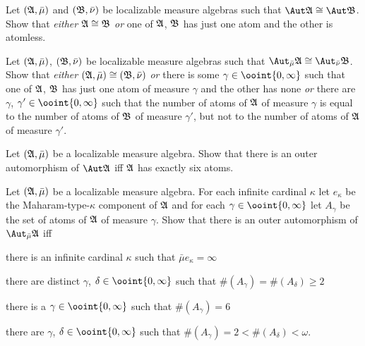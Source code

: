 { %
Let $(\frak A,\bar\mu)$ and
$(\frak B,\bar\nu)$ be localizable measure algebras such that
$\Aut\frak A\cong\Aut\frak B$.   Show that {\it either}
$\frak A\cong\frak B$ {\it
or} one of $\frak A$, $\frak B$ has just one atom and the other is
atomless.
     
Let $(\frak A,\bar\mu)$, $(\frak B,\bar\nu)$ be
localizable measure algebras such that
$\Aut_{\bar\mu}\frak A\cong\Aut_{\bar\nu}\frak B$.   Show that {\it
either} $(\frak A,\bar\mu)\cong(\frak B,\bar\nu)$ {\it or} there is some
$\gamma\in\ooint{0,\infty}$ such that one of $\frak A$, $\frak B$ has
just one atom of measure $\gamma$ and the other has none {\it or} there
are $\gamma$, $\gamma'\in\ooint{0,\infty}$ such that the number of atoms
of $\frak A$ of measure $\gamma$ is equal to the number of atoms of
$\frak B$ of measure $\gamma'$, but not to the number of atoms of
$\frak A$ of measure $\gamma'$.
     
Let $(\frak A,\bar\mu)$ be a localizable measure
algebra.    Show that there is an outer automorphism of $\Aut\frak A$
iff $\frak A$ has exactly six atoms.
     
Let $(\frak A,\bar\mu)$ be a localizable measure
algebra.   For each infinite cardinal $\kappa$ let $e_{\kappa}$ be the
Maharam-type-$\kappa$ component of $\frak A$ and for each
$\gamma\in\ooint{0,\infty}$ let $A_{\gamma}$ be the set of atoms of
$\frak A$ of measure $\gamma$.
Show that there is an outer automorphism of $\Aut_{\bar\mu}\frak A$ iff
     
 there is an infinite cardinal $\kappa$ such that
$\bar\mu e_{\kappa}=\infty$
     
 there are distinct $\gamma$, $\delta\in\ooint{0,\infty}$
such that $\#(A_{\gamma})=\#(A_{\delta})\ge 2$
     
 there is a $\gamma\in\ooint{0,\infty}$ such that
$\#(A_{\gamma})=6$
     
 there are $\gamma$, $\delta\in\ooint{0,\infty}$ such that
$\#(A_{\gamma})=2<\#(A_{\delta})<\omega$.
}%
     
